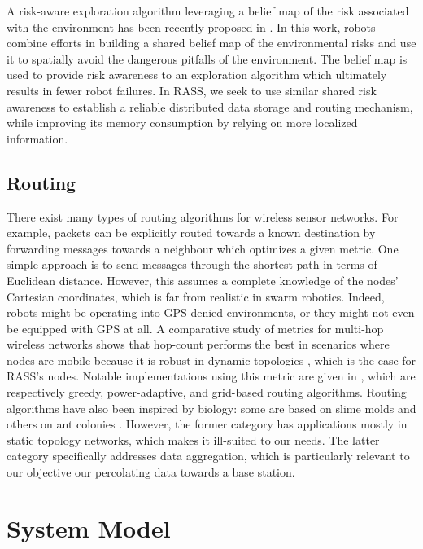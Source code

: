 \documentclass[runningheads]{llncs}
\begin{document}
A risk-aware exploration algorithm leveraging a belief map of the risk
associated with the environment has been recently proposed in
\cite{vielfaure2021dora}. In this work, robots combine efforts in building a shared belief map of the environmental risks and use it to spatially avoid the dangerous
pitfalls of the environment. The belief map is used to provide risk
awareness to an exploration algorithm which ultimately results in
fewer robot failures. In RASS, we seek to use similar shared risk awareness to establish a reliable distributed data storage and
routing mechanism, while improving its memory consumption by relying on more localized information.

\subsection{Routing}

There exist many types of routing algorithms for wireless sensor
networks. For example, packets can be explicitly routed towards a known destination
by forwarding messages towards a neighbour which optimizes a given
metric. One simple approach is to send messages through the
shortest path in terms of Euclidean distance. However, this assumes a
complete knowledge of the nodes' Cartesian coordinates, which is far
from realistic in swarm robotics. Indeed, robots might be operating
into GPS-denied environments, or they might not even be equipped with
GPS at all. A comparative study of metrics for multi-hop wireless networks shows
that hop-count performs the best in scenarios where nodes are mobile
\cite{draves2004comparison} because it is robust in dynamic topologies
\cite{watteyne2009implementation}, which is the case for RASS's
nodes. Notable implementations using this metric are given in
\cite{kuruvila2005hop,zhang2014efficient,al2019efficient}, which are
respectively greedy, power-adaptive, and grid-based routing algorithms.
Routing algorithms have also been inspired by biology: some are based
on slime molds \cite{li2011slime,jiang2018toward} and others on ant
colonies \cite{jiang2018effective,liao2008data}. However, the
former category has applications mostly in static topology networks,
which makes it ill-suited to our needs. The latter category
specifically addresses data aggregation, which is particularly
relevant to our objective our percolating data towards a base station.


\section{System Model}
\label{systemmodel}
\end{document}
